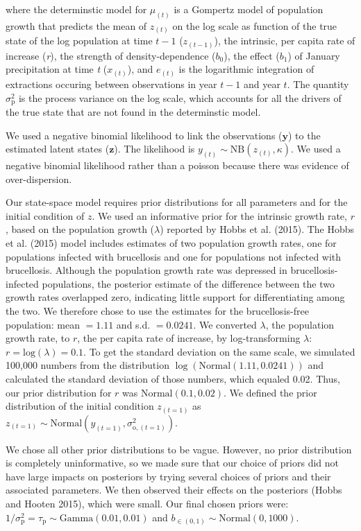 \documentclass[12pt,]{article}
\begin{document}
\noindent{}where the determinstic model for \(\mu_{(t)}\) is a Gompertz
model of population growth that predicts the mean of \(z_{(t)}\) on the
log scale as function of the true state of the log population at time
\(t-1\) (\(z_{(t-1)}\)), the intrinsic, per capita rate of increase
(\emph{r}), the strength of density-dependence (\(b_0\)), the effect
(\(b_1\)) of January precipitation at time \emph{t} (\(x_{(t)}\)), and
\(e_{(t)}\) is the logarithmic integration of extractions occuring
between observations in year \(t-1\) and year \(t\). The quantity
\(\sigma^2_\text{p}\) is the process variance on the log scale, which
accounts for all the drivers of the true state that are not found in the
determinstic model.

We used a negative binomial likelihood to link the observations
(\(\textbf{y}\)) to the estimated latent states (\(\textbf{z}\)). The
likelihood is
\(y_{(t)} \sim \text{NB} \left( z_{(t)} , \kappa \right)\). We used a
negative binomial likelihood rather than a poisson because there was
evidence of over-dispersion.

Our state-space model requires prior distributions for all parameters
and for the initial condition of \(z\). We used an informative prior for
the intrinsic growth rate, \(r\), based on the population growth
(\(\lambda\)) reported by Hobbs et al. (2015). The Hobbs et al. (2015)
model includes estimates of two population growth rates, one for
populations infected with brucellosis and one for populations not
infected with brucellosis. Although the population growth rate was
depressed in brucellosis-infected populations, the posterior estimate of
the difference between the two growth rates overlapped zero, indicating
little support for differentiating among the two. We therefore chose to
use the estimates for the brucellosis-free population: mean \(= 1.11\)
and s.d. \(=0.0241\). We converted \(\lambda\), the population growth
rate, to \(r\), the per capita rate of increase, by log-transforming
\(\lambda\): \(r = \text{log}(\lambda) = 0.1\). To get the standard
deviation on the same scale, we simulated 100,000 numbers from the
distribution \(\log(\text{Normal}(1.11,0.0241))\) and calculated the
standard deviation of those numbers, which equaled 0.02. Thus, our prior
distribution for \(r\) was \(\text{Normal}(0.1, 0.02)\). We defined the
prior distribution of the initial condition \(z_{(t=1)}\) as
\(z_{(t=1)} \sim \text{Normal} \left(y_{(t=1)}, \sigma^2_{\text{o},(t=1)} \right)\).

We chose all other prior distributions to be vague. However, no prior
distribution is completely uninformative, so we made sure that our
choice of priors did not have large impacts on posteriors by trying
several choices of priors and their associated parameters. We then
observed their effects on the posteriors (Hobbs and Hooten 2015), which
were small. Our final chosen priors were:
\(1/\sigma^2_{\text{p}} = \tau_\text{p} \sim \text{Gamma}(0.01,0.01)\)
and \(b_{\in (0,1)} \sim \text{Normal}(0,1000)\).
\end{document}
